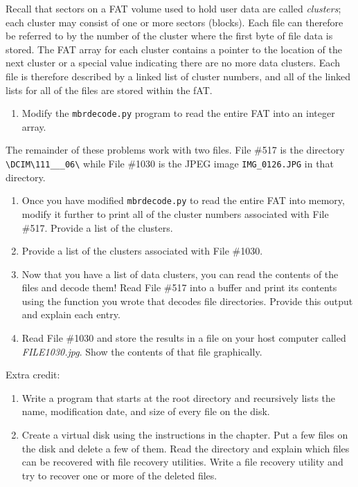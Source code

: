 \noindent   Recall that sectors on a FAT volume used to hold user data are
  called \emph{clusters};  each cluster may consist of one or
  more sectors (blocks). Each file can therefore be referred to by the
  number of the cluster where the first byte of file data is
  stored. The FAT array for each cluster contains a pointer to the
  location of the next cluster or a special value indicating there are
  no more data clusters. Each file is therefore described by a linked
  list of cluster numbers, and all of the linked lists for all of the
  files are stored within the fAT.

\begin{enumerate}[resume]
\item Modify the \texttt{mbrdecode.py} program to read the
  entire FAT into an integer array. 
\end{enumerate}
  
\noindent  The remainder of these problems work with two
  files. File \#517 is the
  directory \verb|\DCIM\111___06\| while File \#1030 is the JPEG image
  \verb|IMG_0126.JPG| in that directory.

\begin{enumerate}[resume]
\item  Once you have modified \texttt{mbrdecode.py} to read the entire FAT
  into memory, modify it further to print all of the cluster numbers 
  associated with File \#517. Provide a list of the clusters.

\item Provide a list of the clusters associated with File \#1030.

\item Now that you have a list of data clusters, you can read the
  contents of the files and decode them!  Read File \#517 into a
  buffer and print its contents using the function you wrote that
  decodes file directories. Provide this output and explain each entry.

\item Read File \#1030 and store the results in a file on your host
  computer called \emph{FILE1030.jpg}. Show the contents of that file graphically.

\end{enumerate}
  
\noindent Extra credit:


\begin{enumerate}[resume]
\item Write a program that starts at the root
  directory and recursively lists the name, modification date, and
  size of every file on the disk.
\item Create a virtual disk using the instructions in the chapter. Put
  a few files on the disk and delete a few of them. Read the directory
  and explain which files can be recovered with file recovery
  utilities. Write a file recovery utility and try to recover one or
  more of the deleted files.
\end{enumerate}




